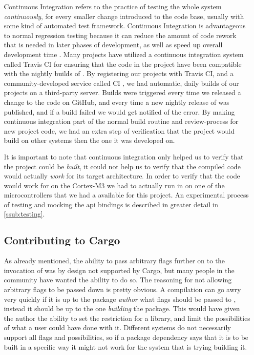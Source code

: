 Continuous Integration refers to the practice of testing the whole system \emph{continuously}, for every smaller change introduced to the code base, usually with some kind of automated test framework.
Continuous Integration is advantageous to normal regression testing because it can reduce the amount of code rework that is needed in later phases of development, as well as speed up overall development time  \cite{Orso2014}.
Many {\rust} projects have utilized a continuous integration system called Travis CI \cite{web:travis_ci} for ensuring that the code in the project have been compatible with the nightly builds of {\rust}.
By registering our projects with Travis CI, and a community-developed service called {\rust} CI \cite{web:rust_ci}, we had automatic, daily builds of our projects on a third-party server.
Builds were triggered every time we released a change to the code on GitHub, and every time a new nightly release of {\rust} was published, and if a build failed we would get notified of the error.
By making continuous integration part of the normal build routine and review-process for new project code, we had an extra step of verification that the project would build on other systems then the one it was developed on.

It is important to note that continuous integration only helped us to verify that the project could be \emph{built}, it could not help us to verify that the compiled code would actually \emph{work} for its target architecture.
In order to verify that the code would work for on the Cortex-M3 we had to actually run in on one of the microcontrollers that we had a available for this project.
An experimental process of testing and mocking the {\emlib} \gls{api} bindings is described in greater detail in \autoref{ssub:testing}.

\subsection{Contributing to Cargo}
\label{ssub:contributing_to_cargo}

As already mentioned, the ability to pass arbitrary flags further on to the invocation of {\rustc} was by design not supported by Cargo, but many people in the {\rust} community have wanted the ability to do so.
The reasoning for not allowing arbitrary flags to be passed down is pretty obvious.
A compilation can go awry very quickly if it is up to the package \emph{author} what flags should be passed to {\rustc}, instead it should be up to the one \emph{building} the package.
This would have given the author the ability to set the restriction for a library, and limit the possibilities of what a user could have done with it.
Different systems do not necessarily support all flags and possibilities, so if a package dependency says that it is to be built in a specific way it might not work for the system that is trying building it.

